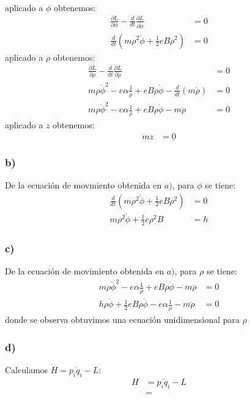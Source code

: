 \documentclass{article}
\begin{document}
\begin{tcolorbox}[breakable]
\begin{align*}
    \end{align*}
    aplicado a $\phi$ obtenemos:
    \begin{align*}
        \frac{\partial L}{\partial \phi} - \frac{d}{dt}\frac{\partial L}{\partial \dot{\phi}} &= 0 \\
        \frac{d}{dt}(m\rho^2\dot{\phi} + \frac{1}{2}eB\rho^2) &= 0
     \end{align*}
     aplicado a $\rho$ obtenemos:
    \begin{align*}
        \frac{\partial L}{\partial \rho} - \frac{d}{dt}\frac{\partial L}{\partial \dot{\rho}} &= 0 \\
        m\rho \dot{\phi}^2 - e\alpha \frac{1}{\rho} + eB\rho \dot{\phi} - \frac{d}{dt}(m\dot{\rho}) &= 0 \\
        m\rho \dot{\phi}^2 - e\alpha \frac{1}{\rho} + eB\rho \dot{\phi} - m\ddot{\rho} &= 0 
    \end{align*}
    aplicado a $z$ obtenemos:
    \begin{align*}
        mz &= 0
    \end{align*}
    \subsubsection*{b)}
    De la ecuación de movmiento obtenida en $a)$, para $\phi$ se tiene:
    \begin{align*}
        \frac{d}{dt}(m\rho^2\dot{\phi} + \frac{1}{2}eB\rho^2) &= 0 \\
        m\rho^2\dot{\phi} + \frac{1}{2}e\rho^2B &= h
    \end{align*}
    \subsubsection*{c)}
    De la ecuación de movimiento obtenida en $a)$, para $\rho$ se tiene:
    \begin{align*}
        m\rho \dot{\phi}^2 - e\alpha \frac{1}{\rho} + eB\rho \dot{\phi} - m\ddot{\rho} &= 0 \\
        h\rho \dot{\phi} +  \frac{1}{2}eB\rho \dot{\phi} - e\alpha \frac{1}{\rho}  - m\ddot{\rho} &= 0
    \end{align*}
    donde se observa obtuvimos una ecuación unidimensional para $\rho$
    \subsubsection*{d)}
    Calculamos $H = p_i\dot{q}_i - L$:
    \begin{align*}
        H 
        &= p_i\dot{q}_i - L \\
        &= 
    \end{align*}

\end{tcolorbox}
\end{document}
